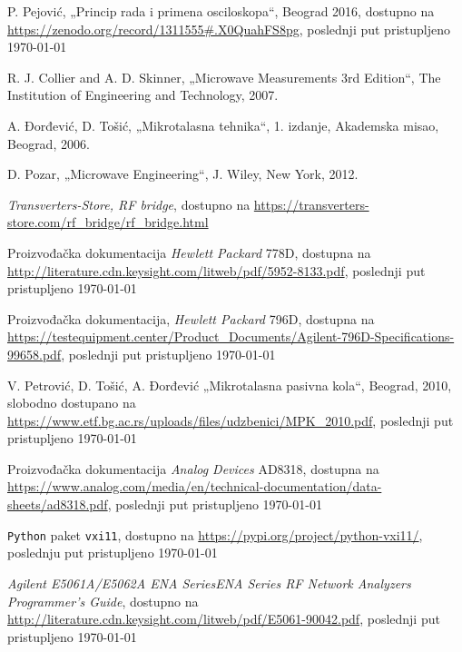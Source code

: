 
\begin{thebibliography}{9}

P. Pejović, „Princip rada i primena osciloskopa“, Beograd 2016,  
dostupno na \url{https://zenodo.org/record/1311555#.X0QuahFS8pg}, 
poslednji put pristupljeno \today

R. J. Collier and A. D. Skinner, „Microwave Measurements 3rd Edition“, The Institution of Engineering and Technology, 2007.

A. Đorđević, D. Tošić, „Mikrotalasna tehnika“, 1. izdanje, Akademska misao, Beograd, 2006. 

D. Pozar, „Microwave Engineering“, J. Wiley, New York, 2012.

\textit{Transverters-Store, RF bridge}, dostupno na
\url{https://transverters-store.com/rf_bridge/rf_bridge.html}

Proizvođačka dokumentacija 
\textit{Hewlett Packard} 778D, dostupna na
\url{http://literature.cdn.keysight.com/litweb/pdf/5952-8133.pdf},
poslednji put pristupljeno \today

Proizvođačka dokumentacija, 
\textit{Hewlett Packard} 796D, dostupna na
\url{https://testequipment.center/Product_Documents/Agilent-796D-Specifications-99658.pdf},
poslednji put pristupljeno \today

V. Petrović, D. Tošić, A. Đorđević 
„Mikrotalasna pasivna kola“, Beograd, 2010, slobodno
dostupano na
\url{https://www.etf.bg.ac.rs/uploads/files/udzbenici/MPK_2010.pdf}, 
poslednji put pristupljeno \today

Proizvođačka dokumentacija 
\textit{Analog Devices} AD8318, dostupna na
\url{https://www.analog.com/media/en/technical-documentation/data-sheets/ad8318.pdf},
poslednji put pristupljeno \today

\verb|Python| paket \verb|vxi11|, dostupno
na \url{https://pypi.org/project/python-vxi11/},
poslednju put pristupljeno \today

\textit{Agilent E5061A/E5062A ENA SeriesENA Series RF Network Analyzers Programmer’s Guide},
dostupno na \url{http://literature.cdn.keysight.com/litweb/pdf/E5061-90042.pdf}, poslednji 
put pristupljeno \today

\end{thebibliography}


